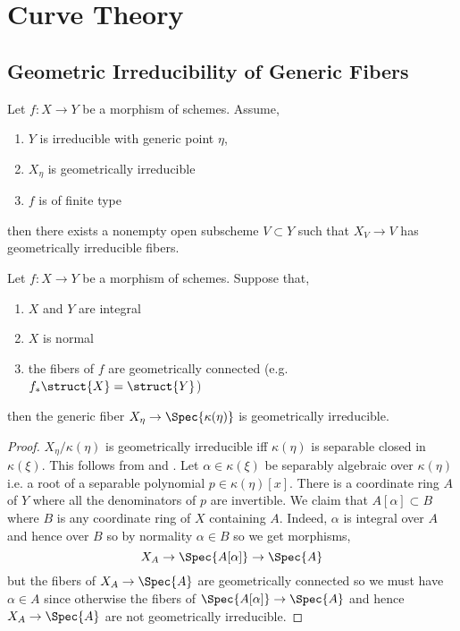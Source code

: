 \documentclass[12pt]{article}
\begin{document}
\sloppy

\section{Curve Theory}

\subsection{Geometric Irreducibility of Generic Fibers}

\begin{lemma}
Let $f : X \to Y$ be a morphism of schemes. Assume,
\begin{enumerate}
\item $Y$ is irreducible with generic point $\eta$,
\item $X_\eta$ is geometrically irreducible
\item $f$ is of finite type
\end{enumerate}
then there exists a nonempty open subscheme $V \subset Y$ such that $X_V \to V$ has geometrically irreducible fibers.
\end{lemma}

\begin{lemma} \label{lemma:normal_geom_integral}
Let $f : X \to Y$ be a morphism of schemes. Suppose that,
\begin{enumerate}
\item $X$ and $Y$ are integral
\item $X$ is normal
\item the fibers of $f$ are geometrically connected (e.g. $f_* \struct{X} = \struct{Y}$)
\end{enumerate}
then the generic fiber $X_\eta \to \Spec{\kappa(\eta)}$ is geometrically irreducible.
\end{lemma}

\begin{proof}
$X_\eta / \kappa(\eta)$ is geometrically irreducible iff $\kappa(\eta)$ is separable closed in $\kappa(\xi)$. This follows from  and . Let $\alpha \in \kappa(\xi)$ be separably algebraic over $\kappa(\eta)$ i.e. a root of a separable polynomial $p \in \kappa(\eta)[x]$. There is a coordinate ring $A$ of $Y$ where all the denominators of $p$ are invertible. We claim that $A[\alpha] \subset B$ where $B$ is any coordinate ring of $X$ containing $A$. Indeed, $\alpha$ is integral over $A$ and hence over $B$ so by normality $\alpha \in B$ so we get morphisms,
\[ X_A \to \Spec{A[\alpha]} \to \Spec{A} \]
but the fibers of $X_A \to \Spec{A}$ are geometrically connected so we must have $\alpha \in A$ since otherwise the fibers of $\Spec{A[\alpha]} \to \Spec{A}$ and hence $X_A \to \Spec{A}$ are not geometrically irreducible.
\end{proof}
\end{document}

